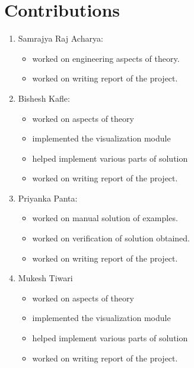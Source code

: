 
	\chapter{Contributions}
	\begin{enumerate}
		\item  Samrajya Raj Acharya:
		   \begin{itemize}
		   \item worked on engineering aspects of theory.  
		   \item  worked on writing report of the project.
		   \end{itemize}
	   
		 \item  Bishesh Kafle:
		 \begin{itemize}
		 	\item worked on aspects of theory
			\item implemented the visualization module
			\item helped implement various parts of solution
		 	\item  worked on writing report of the project.
		 \end{itemize}
		 
		 \item  Priyanka Panta:
		 \begin{itemize}
		 	\item worked on manual solution of examples.
		 	\item worked on verification of solution obtained.
 		 	\item worked on writing report of the project.
		 \end{itemize}
		 
		 
		 \item  Mukesh Tiwari	 
		 \begin{itemize}
		 	\item worked on aspects of theory
		 	\item implemented the visualization module
		 	\item helped implement various parts of solution
		 	\item  worked on writing report of the project.
		 \end{itemize}
	\end{enumerate}
